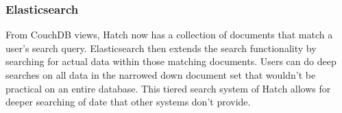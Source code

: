 \subsubsection{Elasticsearch}
From CouchDB views, Hatch now has a collection of documents that match a user's search
query. Elasticsearch then extends the search functionality by searching for actual data
within those matching documents. Users can do deep searches on all data in the narrowed
down document set that wouldn't be practical on an entire database. This tiered
search system of Hatch allows for deeper searching of date that other systems don't
provide.
